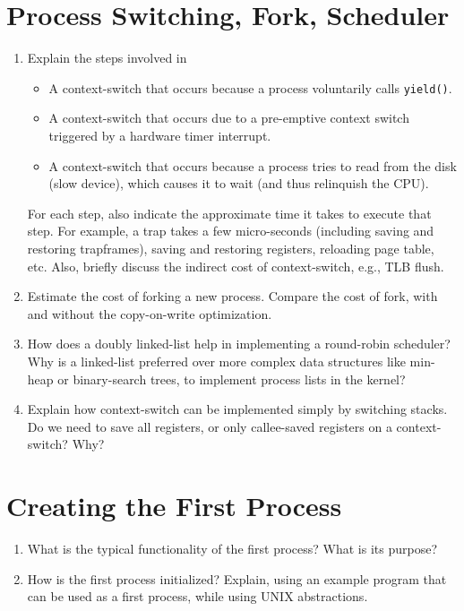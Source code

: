 \section{Process Switching, Fork, Scheduler}
\begin{enumerate}
\item Explain the steps involved in
\begin{itemize}
\item A context-switch that occurs because a process voluntarily calls {\tt yield()}.
\item A context-switch that occurs due to a pre-emptive context switch
triggered by a hardware timer interrupt.
\item A context-switch that occurs because a process tries to read from
the disk (slow device), which causes it to wait (and thus relinquish the CPU).
\end{itemize}
For each step, also indicate the approximate time it takes to execute that
step. For example, a trap takes a few micro-seconds (including saving and restoring
trapframes), saving and restoring registers, reloading page table, etc. Also,
briefly discuss the indirect cost of context-switch, e.g., TLB flush.

\item Estimate the cost of forking a new process. Compare the cost of fork,
with and without the copy-on-write optimization.

\item How does a doubly linked-list help in implementing a round-robin
scheduler? Why is a linked-list preferred over more complex data structures
like min-heap or binary-search trees, to implement process lists in the kernel?

\item Explain how context-switch can be implemented simply by switching
stacks. Do we need to save all registers, or only callee-saved registers on
a context-switch? Why?
\end{enumerate}
\section{Creating the First Process}
\begin{enumerate}
\item What is the typical functionality of the first process? What is its
purpose?
\item How is the first process initialized? Explain, using an example
program that can be used as a first process, while using UNIX abstractions.
\end{enumerate}
